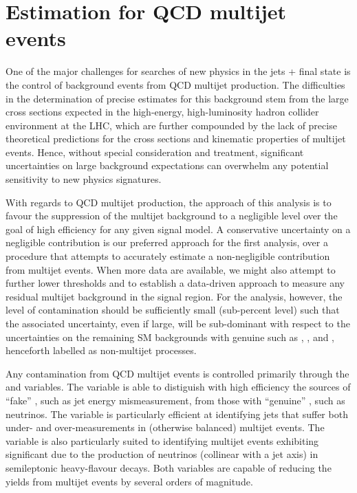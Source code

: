 
\section{Estimation for QCD multijet events \label{sec:qcd}}

One of the major challenges for searches of new physics in the jets +
\met final state is the control of background events from QCD multijet
production. The difficulties in the determination of precise estimates
for this background stem from the large cross sections expected in the
high-energy, high-luminosity hadron collider environment at the LHC,
which are further compounded by the lack of precise theoretical
predictions for the cross sections and kinematic properties of
multijet events. Hence, without special consideration and treatment,
significant uncertainties on large background expectations can
overwhelm any potential sensitivity to new physics signatures.

With regards to QCD multijet production, the approach of this analysis
is to favour the suppression of the multijet background to a
negligible level over the goal of high efficiency for any given signal
model. A conservative uncertainty on a negligible contribution is our
preferred approach for the first analysis, over a procedure that
attempts to accurately estimate a non-negligible contribution from
multijet events. When more data are available, we might also attempt to
further lower thresholds and to establish a data-driven approach to
measure any residual multijet background in the signal region. For the
analysis, however, the level of contamination should be sufficiently
small (\ie sub-percent level) such that the associated uncertainty, even
if large, will be sub-dominant with respect to the uncertainties on the
remaining SM backgrounds with genuine \met such as \wj, \znunu, and
\ttbar, henceforth labelled as non-multijet processes.




Any contamination from QCD multijet events is controlled primarily
through the \alphat and \bdphi variables. The \alphat variable is able
to distiguish with high efficiency the sources of ``fake'' \met, such
as jet energy mismeasurement, from those with ``genuine'' \met, such
as neutrinos. The \bdphi variable is particularly efficient at
identifying jets that suffer both under- and over-measurements in
(otherwise balanced) multijet events. The variable is also
particularly suited to identifying multijet events exhibiting
significant \met due to the production of neutrinos (collinear with a
jet axis) in semileptonic heavy-flavour decays. Both variables are
capable of reducing the yields from multijet events by several orders
of magnitude.

